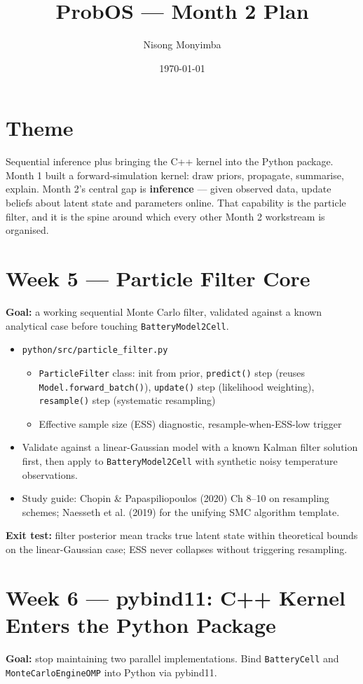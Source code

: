 \documentclass[11pt]{article}
\title{ProbOS --- Month 2 Plan}
\author{Nisong Monyimba}
\date{\today}
\begin{document}
\maketitle

\section*{Theme}
Sequential inference plus bringing the C++ kernel into the Python package.
Month 1 built a forward-simulation kernel: draw priors, propagate,
summarise, explain. Month 2's central gap is \textbf{inference} --- given
observed data, update beliefs about latent state and parameters online.
That capability is the particle filter, and it is the spine around which
every other Month 2 workstream is organised.

\section*{Week 5 --- Particle Filter Core}
\textbf{Goal:} a working sequential Monte Carlo filter, validated against
a known analytical case before touching \texttt{BatteryModel2Cell}.

\begin{itemize}[leftmargin=*]
  \item \texttt{python/src/particle\_filter.py}
  \begin{itemize}
    \item \texttt{ParticleFilter} class: init from prior, \texttt{predict()}
      step (reuses \texttt{Model.forward\_batch()}), \texttt{update()} step
      (likelihood weighting), \texttt{resample()} step (systematic
      resampling)
    \item Effective sample size (ESS) diagnostic, resample-when-ESS-low
      trigger
  \end{itemize}
  \item Validate against a linear-Gaussian model with a known Kalman
    filter solution first, then apply to \texttt{BatteryModel2Cell} with
    synthetic noisy temperature observations.
  \item Study guide: Chopin \& Papaspiliopoulos (2020) Ch 8--10 on
    resampling schemes; Naesseth et al. (2019) for the unifying SMC
    algorithm template.
\end{itemize}
\textbf{Exit test:} filter posterior mean tracks true latent state within
theoretical bounds on the linear-Gaussian case; ESS never collapses
without triggering resampling.

\section*{Week 6 --- pybind11: C++ Kernel Enters the Python Package}
\textbf{Goal:} stop maintaining two parallel implementations. Bind
\texttt{BatteryCell} and \texttt{MonteCarloEngineOMP} into Python via
pybind11.
\end{document}
